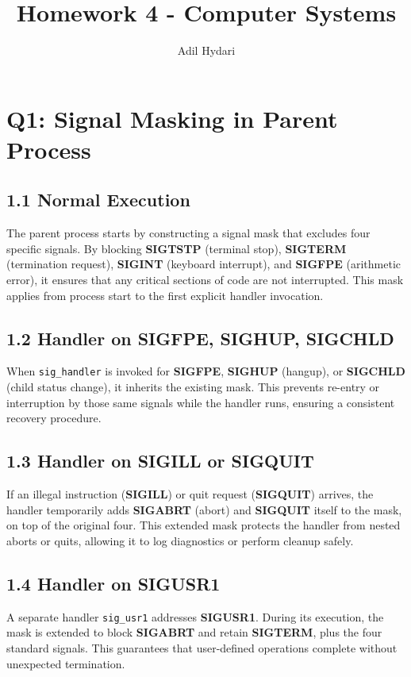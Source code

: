 \documentclass[12pt]{article}
\begin{document}
	\title{Homework 4 - Computer Systems}
	\author{Adil Hydari}
	\date{}
	\maketitle
	
	\section*{Q1: Signal Masking in Parent Process}
	\subsection*{1.1 Normal Execution}
	The parent process starts by constructing a signal mask that excludes four specific signals. By blocking \textbf{SIGTSTP} (terminal stop), \textbf{SIGTERM} (termination request), \textbf{SIGINT} (keyboard interrupt), and \textbf{SIGFPE} (arithmetic error), it ensures that any critical sections of code are not interrupted. This mask applies from process start to the first explicit handler invocation.
	
	\subsection*{1.2 Handler on SIGFPE, SIGHUP, SIGCHLD}
	When \texttt{sig\_handler} is invoked for \textbf{SIGFPE}, \textbf{SIGHUP} (hangup), or \textbf{SIGCHLD} (child status change), it inherits the existing mask. This prevents re-entry or interruption by those same signals while the handler runs, ensuring a consistent recovery procedure.
	
	\subsection*{1.3 Handler on SIGILL or SIGQUIT}
	If an illegal instruction (\textbf{SIGILL}) or quit request (\textbf{SIGQUIT}) arrives, the handler temporarily adds \textbf{SIGABRT} (abort) and \textbf{SIGQUIT} itself to the mask, on top of the original four. This extended mask protects the handler from nested aborts or quits, allowing it to log diagnostics or perform cleanup safely.
	
	\subsection*{1.4 Handler on SIGUSR1}
	A separate handler \texttt{sig\_usr1} addresses \textbf{SIGUSR1}. During its execution, the mask is extended to block \textbf{SIGABRT} and retain \textbf{SIGTERM}, plus the four standard signals. This guarantees that user-defined operations complete without unexpected termination.
	
\end{document}
